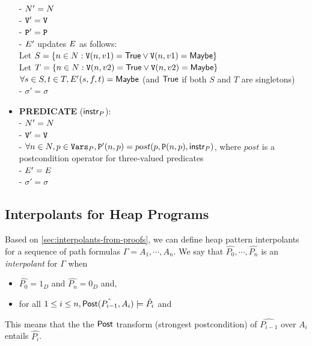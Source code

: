 \begin{itemize}
    - $N' = N$ \\
    - $\mathtt{V}' = \mathtt{V}$ \\
    - $\mathtt{P}' = \mathtt{P}$ \\
    - $E'$ updates $E$ as follows: \\
      \hspace*{1em} Let $S = \{n \in N : \mathtt{V}(n, v1) = \mathsf{True} \vee \mathtt{V}(n, v1) = \mathsf{Maybe}\}$ \\
      \hspace*{1em} Let $T = \{n \in N : \mathtt{V}(n, v2) = \mathsf{True} \vee \mathtt{V}(n, v2) = \mathsf{Maybe}\}$ \\
      \hspace*{1em} $\forall s \in S, t \in T, E'(s,f,t) = \mathsf{Maybe}$ (and $\mathsf{True}$ if both $S$ and $T$ are singletons) \\
    - $\sigma' = \sigma$
  \item \textbf{PREDICATE} ($\mathsf{instr}_P$): \\
    - $N' = N$ \\
    - $\mathtt{V}' = \mathtt{V}$ \\
    - $\forall n \in N, p \in \mathtt{Vars}_P, \mathtt{P}'(n,p) = post(p, \mathtt{P}(n,p), \mathsf{instr}_P)$, where $post$ is a postcondition operator for three-valued predicates \\
    - $E' = E$ \\
    - $\sigma' = \sigma$
\end{itemize}

\subsection{Interpolants for Heap Programs}
\label{sec:heap-interpolants-from-proofs}
Based on \autoref{sec:interpolants-from-proofs}, we can define heap pattern interpolants for a sequence of path formulas $\Gamma = A_1, \cdots , A_n$. We say that $\hat{P_0},\cdots, \hat{P_n}$ is an \textit{interpolant} for $\Gamma$ when

\begin{itemize}
  \item $\hat{P_0} = 1_D$ and $\hat{P_n} = 0_D$ and,
  \item for all $1 \leq i \leq n, \mathsf{Post}(\hat{P_{i-1}}, A_i) \models \hat{P_i}$ and
\end{itemize}

This means that the the $\mathsf{Post}$ transform (strongest postcondition) of $\hat{P_{i-1}}$
over $A_i$ entails $\hat{P_{i}}$.

